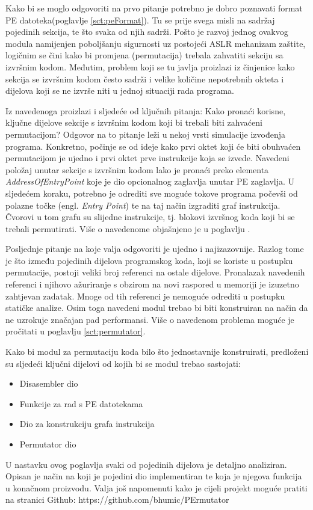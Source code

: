 \documentclass[times, utf8, diplomski, numeric]{fer}
\begin{document}
Kako bi se moglo odgovoriti na prvo pitanje potrebno je dobro poznavati format PE datoteka(poglavlje \ref{sct:peFormat}). Tu se prije svega misli na sadržaj pojedinih sekcija, te što svaka od njih sadrži. Pošto je razvoj jednog ovakvog modula namijenjen poboljšanju sigurnosti uz postojeći ASLR mehanizam zaštite, logičnim se čini kako bi promjena (permutacija) trebala zahvatiti sekciju sa izvršnim kodom. Međutim, problem koji se tu javlja proizlazi iz činjenice kako sekcija se izvršnim kodom često sadrži i velike količine nepotrebnih okteta i dijelova koji se ne izvrše niti u jednoj situaciji rada programa. 

Iz navedenoga proizlazi i sljedeće od ključnih pitanja: Kako pronaći korisne, ključne dijelove sekcije s izvršnim kodom koji bi trebali biti zahvaćeni permutacijom? Odgovor na to pitanje leži u nekoj vrsti simulacije izvođenja programa. Konkretno, počinje se od ideje kako prvi oktet koji će biti obuhvaćen permutacijom je ujedno i prvi oktet prve instrukcije koja se izvede. Navedeni položaj unutar sekcije s izvršnim kodom lako je pronaći preko elementa \emph{AddressOfEntryPoint} koje je dio opcionalnog zaglavlja unutar PE zaglavlja. U sljedećem koraku, potrebno je odrediti sve moguće tokove programa počevši od polazne točke (engl. \emph{Entry Point}) te na taj način izgraditi graf instrukcija. Čvorovi u tom grafu su slijedne instrukcije, tj. blokovi izvršnog koda koji bi se trebali permutirati. Više o navedenome objašnjeno je u poglavlju \label{sct:instrucionGraph}.

Posljednje pitanje na koje valja odgovoriti je ujedno i najizazovnije. Razlog tome je što između pojedinih dijelova programskog koda, koji se koriste u postupku permutacije, postoji veliki broj referenci na ostale dijelove. Pronalazak navedenih referenci i njihovo ažuriranje s obzirom na novi raspored u memoriji je izuzetno zahtjevan zadatak. Mnoge od tih referenci je nemoguće odrediti u postupku statičke analize. Osim toga navedeni modul trebao bi biti konstruiran na način da ne uzrokuje značajan pad performansi. Više o navedenom problema moguće je pročitati u poglavlju \ref{sct:permutator}.

Kako bi modul za permutaciju koda bilo što jednostavnije konstruirati, predloženi su sljedeći ključni dijelovi od kojih bi se modul trebao sastojati:
\begin{itemize}
\item Disasembler dio
\item Funkcije za rad s PE datotekama
\item Dio za konstrukciju grafa instrukcija
\item Permutator dio
\end{itemize}
U nastavku ovog poglavlja svaki od pojedinih dijelova je detaljno analiziran. Opisan je način na koji je pojedini dio implementiran te koja je njegova funkcija u konačnom proizvodu. Valja još napomenuti kako je cijeli projekt moguće pratiti na stranici Github: https://github.com/bhumic/PErmutator
\pagebreak
\end{document}
